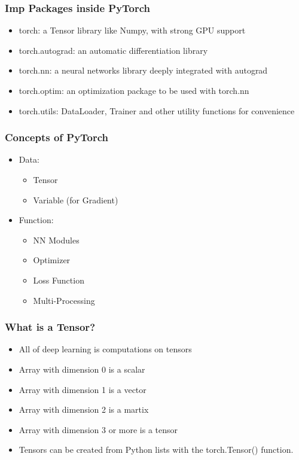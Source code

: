 \begin{frame}[fragile] \frametitle{Imp Packages inside PyTorch}
\begin{itemize}
\item  torch: a Tensor library like Numpy, with strong GPU support
\item torch.autograd: an automatic differentiation library 
\item torch.nn: a neural networks library deeply integrated with autograd 
\item torch.optim: an optimization package to be used with torch.nn
\item torch.utils: DataLoader, Trainer and other utility functions for convenience
\end{itemize}
\end{frame}


\begin{frame}[fragile] \frametitle{Concepts of PyTorch}
\begin{itemize}
\item Data:
\begin{itemize}
\item  Tensor
\item Variable (for Gradient)
\end{itemize}
\item Function:
\begin{itemize}
\item   NN Modules
\item   Optimizer
\item   Loss Function
\item   Multi-Processing
\end{itemize}
\end{itemize}
\end{frame}

\begin{frame}[fragile]
\frametitle{What is a Tensor?}
\begin{itemize}
\item All of deep learning is computations on tensors
\item Array with dimension 0 is a scalar
\item Array with dimension 1 is a vector
\item Array with dimension 2 is a martix
\item Array with dimension 3 or more is a tensor
\item Tensors can be created from Python lists with the torch.Tensor() function.
\end{itemize}
 \end{frame} 
 
